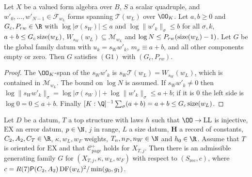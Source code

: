 \begin{lemma}\label{pf:onto1:scaledFamily}
Let $X$ be a valued form algebra over $B$, $S$ a scalar quadruple, and $w'_0,\dots,w'_{N-1}\in\mathcal F_{w_L}$ forms
spanning $\mathcal T(w_L)$ over $\OO_K$. Let $a,b\ge0$ and $G_c,P_{rw}\in\R$ with $\log|\sigma(s_W)|\le a$ and
$\log\|w'_k\|_\sigma\le b$ for all $\sigma,k$, $a+b\le G_c\operatorname{size}(w_L)$, $W_{s_W}(w_L)\subseteq\mathcal M_{w_L}$ and
$\log N\le P_{rw}(\operatorname{size}(w_L)-1)$. Let $G$ be the global family datum with $u_k=s_Ww'_k$, $m_x\equiv a+b$, and
all other components empty or zero. Then $G$ satisfies $(\mathrm G1)$ with $(G_c,P_{rw})$.
\end{lemma}

\begin{proof}
The $\OO_K$-span of the $s_Ww'_k$ is $s_W\mathcal T(w_L)=W_{s_W}(w_L)$, which is contained in $\mathcal M_{w_L}$. The bound on
$\log N$ is assumed. If $s_Ww'_k\ne0$ then $\log\|s_Ww'_k\|_\sigma=\log|\sigma(s_W)|+\log\|w'_k\|_\sigma\le a+b$; if it is $0$
the left side is $\log0=0\le a+b$. Finally $[K:\Q]^{-1}\sum_\sigma(a+b)=a+b\le G_c\ontoonesize(w_L)$.
\end{proof}

\begin{theorem}\label{pf:onto1:genok}
Let $D$ be a datum, $T$ a top structure with laws $h$ such that $\OO\to\mathrm{LL}$ is injective, $\mathrm{EX}$ an error
datum, $p\in\N$, $j$ in range, $L$ a size datum, $\mathbf H$ a record of constants, $C_2,A_2,C_T\in\R$,
$\kappa,w_L,w_F$ weights, $T_n,n_P,n_W\in\N$ and $h_0\in\R$. Assume that $T$ is oriented for $\mathrm{EX}$ and that $\mathcal
C^+_{\mathrm{page}}$ holds for $X_{T,j}$. Then there is an admissible generating family $G$ for $(X_{T,j},\kappa,w_L,w_F)$
with respect to $(S_{\mathrm{rec}},c)$, where $c=R(7)\mathsf{P}(C_2,A_2)\operatorname{DF}(w_L)^2/\min(g_0,g_1)$.
\end{theorem}

